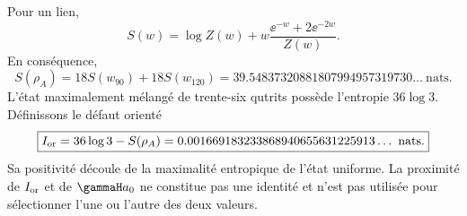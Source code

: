 Pour un lien,
\begin{equation}
\label{rm:eq:modular-link-entropy}
S(w)=\log Z(w)
+w\frac{\ee^{-w}+2\ee^{-2w}}{Z(w)}.
\end{equation}
En conséquence,
\begin{equation}
\label{rm:eq:modular-entropy-value}
S(\rho_A)=18S(w_{90})+18S(w_{120})
=39.54837320881807994957319730\ldots\ \text{nats}.
\end{equation}
L’état maximalement mélangé de trente-six qutrits possède l’entropie \(36\log3\). Définissons le défaut orienté
\begin{equation}
\label{rm:eq:modular-oriented-information}
\boxed{
I_{\rm or}=36\log3-S(\rho_A)
=0.001669183233868940655631225913\ldots\ \text{nats}.}
\end{equation}
Sa positivité découle de la maximalité entropique de l’état uniforme. La proximité de \(I_{\rm or}\) et de \(\gammaH a_0\) ne constitue pas une identité et n’est pas utilisée pour sélectionner l’une ou l’autre des deux valeurs.
